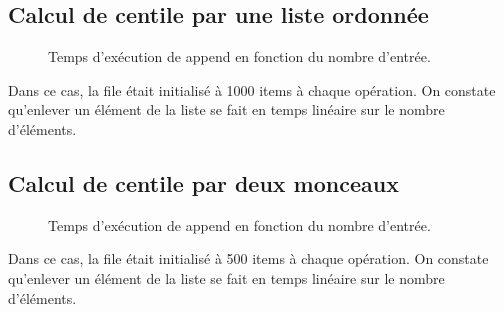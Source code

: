 \documentclass[french]{article}
\begin{document}
\subsection{Calcul de centile par une liste ordonnée}
\begin{figure}
  
\caption{Temps d'exécution de \textsf{append} en fonction du nombre d'entrée.}
\end{figure}
Dans ce cas, la file était initialisé à 1000 items à chaque opération. On
constate qu'enlever un élément de la liste se fait en temps linéaire sur le
nombre d'éléments.

\subsection{Calcul de centile par deux monceaux}
\begin{figure}
  
\caption{Temps d'exécution de \textsf{append} en fonction du nombre d'entrée.}
\end{figure}
Dans ce cas, la file était initialisé à 500 items à chaque opération. On
constate qu'enlever un élément de la liste se fait en temps linéaire sur le
nombre d'éléments.
\end{document}
